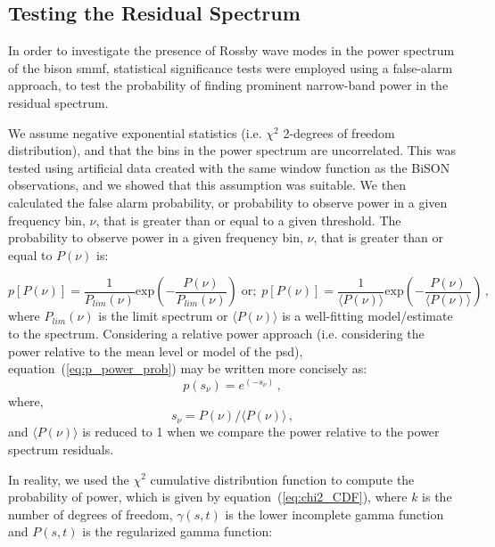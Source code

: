 \subsection{Testing the Residual Spectrum}
In order to investigate the presence of Rossby wave modes in the power spectrum of the \gls{bison} \gls{smmf}, statistical significance tests were employed using a false-alarm approach, to test the probability of finding prominent narrow-band power in the residual spectrum.

We assume negative exponential statistics (i.e. $\chi^2$ 2-degrees of freedom distribution), and that the bins in the power spectrum are uncorrelated. This was tested using artificial data created with the same window function as the BiSON observations, and we showed that this assumption was suitable. We then calculated the false alarm probability, or probability to observe power in a given frequency bin, $\nu$, that is greater than or equal to a given threshold. The probability to observe power in a given frequency bin, $\nu$, that is greater than or equal to $P(\nu)$ is:

\begin{equation}
p[P(\nu)] = \frac{1}{P_{lim}(\nu)} \mathrm{exp}\left(-\frac{P(\nu)}{P_{lim}(\nu)}\right) \; \mathrm{or; } \; p[P(\nu)] = \frac{1}{\langle P(\nu) \rangle} \mathrm{exp}\left(-\frac{P(\nu)}{\langle P(\nu) \rangle}\right) \, ,
\label{eq:p_power_prob}
\end{equation}
%
where $P_{lim}(\nu)$ is the limit spectrum or $\langle P(\nu) \rangle$ is a well-fitting model/estimate to the spectrum. Considering a relative power approach (i.e. considering the power relative to the mean level or model of the \gls{psd}), equation~(\ref{eq:p_power_prob}) may be written more concisely as:
%
\begin{equation}
p(s_{\nu}) = e^{(-s_{\nu})} \, ,
\label{eq:p_power_prob_concise}
\end{equation}
%
where,
%
\begin{equation}
s_{\nu} = P(\nu)/\langle P(\nu) \rangle \, ,
\label{eq:s_v}
\end{equation}
%
and $\langle P(\nu) \rangle$ is reduced to 1 when we compare the power relative to the power spectrum residuals.

In reality, we used the $\chi^2$ cumulative distribution function to compute the probability of power, which is given by equation~(\ref{eq:chi2_CDF}), where $k$ is the number of degrees of freedom, $\gamma(s,t)$ is the lower incomplete gamma function and $P(s,t)$ is the regularized gamma function: 

